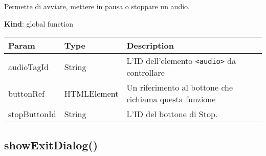 Permette di avviare, mettere in pausa o stoppare un audio.

\textbf{Kind}: global function

\begin{longtable}[]{@{}lll@{}}
\toprule
\begin{minipage}[b]{0.30\columnwidth}\raggedright
Param\strut
\end{minipage} & \begin{minipage}[b]{0.30\columnwidth}\raggedright
Type\strut
\end{minipage} & \begin{minipage}[b]{0.30\columnwidth}\raggedright
Description\strut
\end{minipage}\tabularnewline
\midrule
\endhead
\begin{minipage}[t]{0.30\columnwidth}\raggedright
audioTagId\strut
\end{minipage} & \begin{minipage}[t]{0.30\columnwidth}\raggedright
String\strut
\end{minipage} & \begin{minipage}[t]{0.30\columnwidth}\raggedright
L'ID dell'elemento \texttt{\textless{}audio\textgreater{}} da
controllare\strut
\end{minipage}\tabularnewline
\begin{minipage}[t]{0.30\columnwidth}\raggedright
buttonRef\strut
\end{minipage} & \begin{minipage}[t]{0.30\columnwidth}\raggedright
HTMLElement\strut
\end{minipage} & \begin{minipage}[t]{0.30\columnwidth}\raggedright
Un riferimento al bottone che richiama questa funzione\strut
\end{minipage}\tabularnewline
\begin{minipage}[t]{0.30\columnwidth}\raggedright
stopButtonId\strut
\end{minipage} & \begin{minipage}[t]{0.30\columnwidth}\raggedright
String\strut
\end{minipage} & \begin{minipage}[t]{0.30\columnwidth}\raggedright
L'ID del bottone di Stop.\strut
\end{minipage}\tabularnewline
\bottomrule
\end{longtable}

\hypertarget{showexitdialog-1}{%
\subsection{showExitDialog()}\label{showexitdialog-1}}

